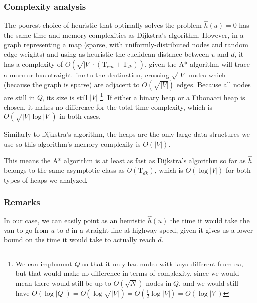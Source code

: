 \subsubsection{Complexity analysis}
The poorest choice of heuristic that optimally solves the problem $\hat{h}(u)=0$ has the same time and memory complexities as Dijkstra's algorithm. However, in a graph representing a map (sparse, with uniformly-distributed nodes and random edge weights) and using as heuristic the euclidean distance between $u$ and $d$, it has a complexity of $O(\sqrt{|V|} \cdot (\text{T}_{em}+\text{T}_{dk}))$, given the A* algorithm will trace a more or less straight line to the destination, crossing $\sqrt{|V|}$ nodes which (because the graph is sparse) are adjacent to $O(\sqrt{|V|})$ edges. Because all nodes are still in $Q$, its size is still $|V|$ \footnote{We can implement $Q$ so that it only has nodes with keys different from $\infty$, but that would make no difference in terms of complexity, since we would mean there would still be up to $O(\sqrt{N})$ nodes in $Q$, and we would still have $O(\log |Q|)=O(\log \sqrt{|V|})=O(\frac{1}{2}\log |V|)=O(\log |V|)$}.
If either a binary heap or a Fibonacci heap is chosen, it makes no difference for the total time complexity, which is $O(\sqrt{|V|} \log |V|)$ in both cases.\par
Similarly to Dijkstra's algorithm, the heaps are the only large data structures we use so this algorithm's memory complexity is $O(|V|)$.\par
This means the A* algorithm is at least as fast as Dijkstra's algorithm so far as $\hat{h}$ belongs to the same asymptotic class as $O(\text{T}_{dk})$, which is $O(\log |V|)$ for both types of heaps we analyzed.
\subsubsection{Remarks}
In our case, we can easily point as an heuristic $\hat{h}(u)$ the time it would take the van to go from $u$ to $d$ in a straight line at highway speed, given it gives us a lower bound on the time it would take to actually reach $d$.
